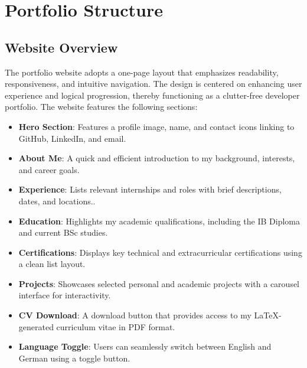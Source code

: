 \chapter{Portfolio Structure}
\section{Website Overview}
The portfolio website adopts a one-page layout that emphasizes readability, responsiveness, and intuitive navigation. The design is centered on enhancing user experience and logical progression, thereby functioning as a clutter-free developer portfolio. The website features the following sections:
\begin{itemize}
	\item \textbf{Hero Section}: Features a profile image, name, and contact icons linking to GitHub, LinkedIn, and email.
	\item \textbf{About Me}: A quick and efficient introduction to my background, interests, and career goals.
	\item \textbf{Experience}: Lists relevant internships and roles with brief descriptions, dates, and locations..
	\item \textbf{Education}: Highlights my academic qualifications, including the IB Diploma and current BSc studies.
	\item \textbf{Certifications}: Displays key technical and extracurricular certifications using a clean list layout.
	\item \textbf{Projects}: Showcases selected personal and academic projects with a carousel interface for interactivity.
	\item \textbf{CV Download}: A download button that provides access to my LaTeX-generated curriculum vitae in PDF format.
	\item \textbf{Language Toggle}: Users can seamlessly switch between English and German using a toggle button.
\end{itemize}

